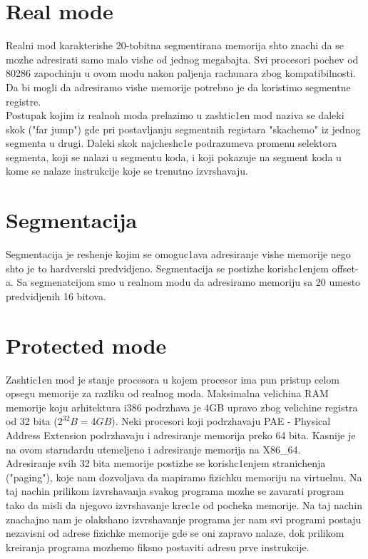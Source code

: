 \documentclass[a4paper,fleqn,12pt]{JMThesis}
\newcommand\eng{\fontencoding{OT1}\fontfamily{\rmdefault}\selectfont}
\begin{document}
\section{{\eng Real mode}}
\medskip

Realni mod karakterishe 20-tobitna segmentirana memorija shto znachi da se
mozhe adresirati samo malo vishe od jednog megabajta. Svi procesori pochev od
80286 zapochinju u ovom modu nakon paljenja rachunara zbog kompatibilnosti. Da
bi mogli da adresiramo vishe memorije potrebno je da koristimo segmentne
registre.\\

Postupak kojim iz realnoh moda prelazimo u zashtic1en mod naziva se daleki skok
{\eng ("far jump")} gde pri postavljanju segmentnih registara "skachemo" iz
jednog segmenta u drugi. Daleki skok najchesh\/c1e podrazumeva promenu selektora
segmenta, koji se nalazi u segmentu koda, i koji pokazuje na segment koda u
kome se nalaze instrukcije koje se trenutno izvrshavaju.

\section{Segmentacija}
\medskip

Segmentacija je reshenje kojim se omoguc1ava adresiranje vishe memorije nego
shto je to hardverski predvidjeno. Segmentacija se postizhe korish\/c1enjem
{\eng offset}-a. Sa segmenatcijom smo u realnom modu da adresiramo memoriju sa
20 umesto predvidjenih 16 bitova.

\section{{\eng Protected mode}}
\medskip

Zashtic1en mod je stanje procesora u kojem procesor ima pun pristup celom
opsegu memorije za razliku od realnog moda. Maksimalna velichina {\eng RAM}
memorije koju arhitektura {\eng i386} podrzhava je {\eng 4GB} upravo zbog
velichine registra od 32 bita ($2^{32}B = 4GB$). Neki procesori koji
podrzhavaju {\eng PAE - Physical Address Extension} podrzhavaju i adresiranje
memorija preko 64 bita. Kasnije je na ovom starndardu utemeljeno i adresiranje
memorija na {\eng X86\_64}.\\

Adresiranje svih 32 bita memorije postizhe se  korish\/c1enjem stranichenja
({\eng "paging"}), koje nam dozvoljava da mapiramo fizichku memoriju na
virtuelnu. Na taj nachin prilikom izvrshavanja svakog programa mozhe se
zavarati program tako da misli da njegovo izvrshavanje krec1e od pocheka
memorije. Na taj nachin znachajno nam je olakshano izvrshavanje programa jer
nam svi programi postaju nezavisni od adrese fizichke memorije gde se oni
zapravo nalaze, dok prilikom kreiranja programa mozhemo fiksno postaviti adresu
prve instrukcije.
\end{document}
